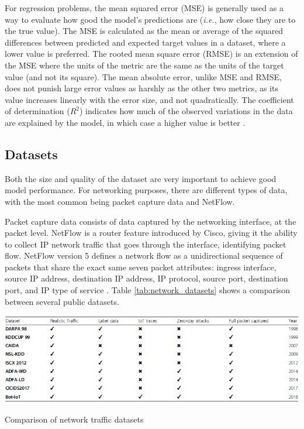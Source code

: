 For regression problems, the mean squared error (MSE) is generally used as a way to evaluate how good the model's predictions are (\textit{i.e.}, how close they are to the true value). The MSE is calculated as the mean or average of the squared differences between predicted and expected target values in a dataset, where a lower value is preferred. The rooted mean square error (RMSE) is an extension of the MSE where the units of the metric are the same as the units of the target value (and not its square). The mean absolute error, unlike MSE and RMSE, does not punish large error values as harshly as the other two metrics, as its value increases linearly with the error size, and not quadratically. The coefficient of determination ($R^2$) indicates how much of the observed variations in the data are explained by the model, in which case a higher value is better \citep{Handelman2019, Brownlee2021}.

\subsection{Datasets}

Both the size and quality of the dataset are very important to achieve good model performance. For networking purposes, there are different types of data, with the most common being packet capture data and NetFlow.\par
Packet capture data consists of data captured by the networking interface, at the packet level. NetFlow is a router feature introduced by Cisco, giving it the ability to collect IP network traffic that goes through the interface, identifying packet flow. NetFlow version 5 defines a network flow as a unidirectional sequence of packets that share the exact same seven packet attributes: ingress interface, source IP address, destination IP address, IP protocol, source port, destination port, and IP type of service \citep{Handelman2019}. Table \ref{tab:network_datasets} shows a comparison between several public datasets.

\begin{table}
    \centering
    \includegraphics[width = \textwidth]{img/parts/introduction/Network Datasets.png}
    \caption{Comparison of network traffic datasets \citep{Khraisat2019}}
    \label{tab:network_datasets}
\end{table}

